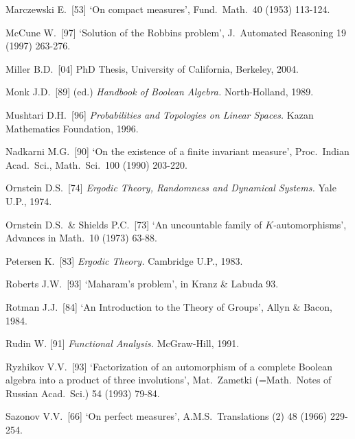 {Marczewski E.\ [53] `On compact measures',
Fund.\ Math.\ 40 (1953) 113-124.  \cmmnt{[342A.]}

McCune W.\ [97] `Solution of the Robbins problem',
J.\ Automated Reasoning 19 (1997) 263-276.
\cmmnt{[311Yc.]}

Miller B.D.\ [04] PhD Thesis, University of California, Berkeley, 2004.
\cmmnt{[382Xc, \S382 {\it notes\/}.]}

Monk J.D.\ [89] (ed.) {\it Handbook of Boolean Algebra.}
North-Holland, 1989.

Mushtari D.H.\ [96] {\it Probabilities and Topologies on Linear Spaces.}
Kazan Mathematics Foundation, 1996.

\medskip %

Nadkarni M.G.\ [90] `On the existence of a finite invariant measure',
Proc.\ Indian Acad.\ Sci., Math.\ Sci.\ 100 (1990) 203-220.
\cmmnt{[\S395 {\it notes\/}.]}

\medskip %

Ornstein D.S.\ [74] {\it Ergodic Theory, Randomness and Dynamical Systems.}  Yale U.P., 1974.
\cmmnt{[\S387 {\it notes\/}.]}

Ornstein D.S.\ \& Shields P.C.\ [73] `An uncountable family of
$K$-automorphisms', Advances in Math.\ 10 (1973) 63-88.
\cmmnt{[\S382 {\it notes\/}.]}

\medskip%


Petersen K.\ [83] {\it Ergodic Theory.}   Cambridge U.P., 1983.
\cmmnt{[328Xa, 385Cb, \S385 {\it notes\/}, 386E.]}

\medskip %

Roberts J.W.\ [93] `Maharam's problem', in {\smc Kranz \& Labuda 93}.
\cmmnt{[\S394 {\it notes\/}.]}

Rotman J.J.\ [84] `An Introduction to the Theory of Groups', Allyn \&
Bacon, 1984.
\cmmnt{[\S384 {\it notes\/}, 3A6B.]}

Rudin W. [91] {\it Functional Analysis.}  McGraw-Hill, 1991.
\cmmnt{[\S3A5.]}

Ryzhikov V.V.\ [93] `Factorization of an automorphism of a complete Boolean algebra into a product of three involutions', Mat.\ Zametki (=Math.\ Notes of Russian Acad.\ Sci.) 54 (1993) 79-84.
\cmmnt{[\S382 {\it notes\/}.]}

\medskip %

Sazonov V.V.\ [66] `On perfect measures', A.M.S.\ Translations (2) 48
(1966) 229-254.   \cmmnt{[\S342 {\it notes\/}.]}

}
